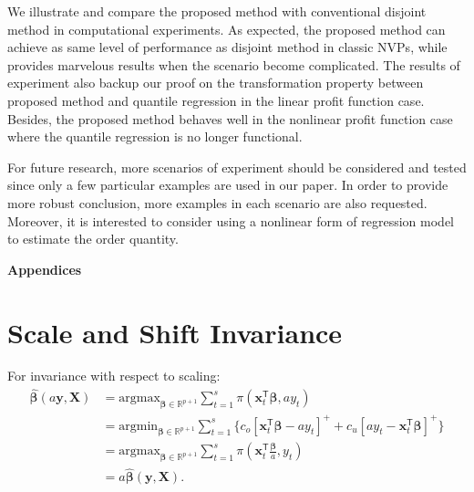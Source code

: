 \documentclass{article}
\begin{document}
We illustrate and compare the proposed method with conventional disjoint method in computational experiments. As expected, the proposed method can achieve as same level of performance as disjoint method in classic NVPs, while provides marvelous results when the scenario become complicated. The results of experiment also backup our proof on the transformation property between proposed method and quantile regression in the linear profit function case. Besides, the proposed method behaves well in the nonlinear profit function case where the quantile regression is no longer functional.

For future research, more scenarios of experiment should be considered and tested since only a few particular examples are used in our paper. In order to provide more robust conclusion, more examples in each scenario are also requested. Moreover, it is interested to consider using a nonlinear form of regression model to estimate the order quantity.
\printbibliography

\newpage
\begin{center}
{\bf\Large Appendices}
\end{center}

\appendix

\section{Scale and Shift Invariance}
\label{app:A}

For invariance with respect to scaling:
\[
    \begin{aligned}
        \hat{\boldsymbol{\beta}}(a\mathbf{y},\mathbf{X})
        &=\text{argmax}_{\boldsymbol{\beta}\in \mathbb{R}^{p+1}}\displaystyle\sum_{t=1}^s{\pi(\mathbf{x}_t^{\mathsf{T}}\boldsymbol{\beta},ay_t)}\\
        &=\text{argmin}_{\boldsymbol{\beta}\in \mathbb{R}^{p+1}}\displaystyle\sum_{t=1}^s{\{c_o[\mathbf{x}_t^{\mathsf{T}}\boldsymbol{\beta}-ay_t]^{+}+c_u[ay_t-\mathbf{x}_t^{\mathsf{T}}\boldsymbol{\beta}]^{+}\}}\\
        &=\text{argmax}_{\boldsymbol{\beta}\in \mathbb{R}^{p+1}}\displaystyle\sum_{t=1}^s{\pi\left(\mathbf{x}_t^{\mathsf{T}}\frac{\boldsymbol{\beta}}{a},y_t\right)}\\
        &=a\hat{\boldsymbol{\beta}}(\mathbf{y},\mathbf{X}).
    \end{aligned}
\]
\end{document}
